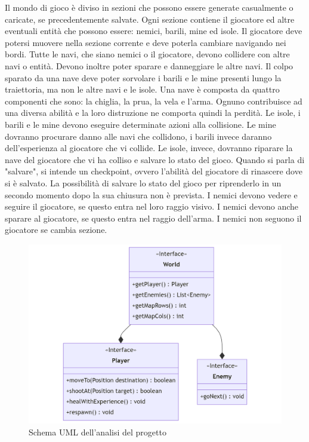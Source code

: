 \documentclass[a4paper,12pt]{report}
\begin{document}
Il mondo di gioco è diviso in sezioni che possono essere generate casualmente o caricate, se precedentemente salvate.
%
Ogni sezione contiene il giocatore ed altre eventuali entità che possono essere: nemici, barili, mine ed isole.
%
Il giocatore deve potersi muovere nella sezione corrente e deve poterla cambiare navigando nei bordi.
%
Tutte le navi, che siano nemici o il giocatore, devono collidere con altre navi o entità.
%
Devono inoltre poter sparare e danneggiare le altre navi.
%
Il colpo sparato da una nave deve poter sorvolare i barili e le mine presenti lungo la traiettoria, ma non le altre navi e le isole.
%
Una nave è composta da quattro componenti che sono: la chiglia, la prua, la vela e l'arma.
%
Ognuno contribuisce ad una diversa abilità e la loro distruzione ne comporta quindi la perdità.
%
Le isole, i barili e le mine devono eseguire determinate azioni alla collisione.
%
Le mine dovranno procurare danno alle navi che collidono, i barili invece daranno dell'esperienza al giocatore che vi collide.
%
Le isole, invece, dovranno riparare la nave del giocatore che vi ha colliso e salvare lo stato del gioco.
%
Quando si parla di "salvare", si intende un checkpoint, ovvero l'abilità del giocatore di rinascere dove si è salvato.
%
La possibilità di salvare lo stato del gioco per riprenderlo in un secondo momento dopo la sua chiusura non è prevista.
%
I nemici devono vedere e seguire il giocatore, se questo entra nel loro raggio visivo.
%
I nemici devono anche sparare al giocatore, se questo entra nel raggio dell'arma.
%
I nemici non seguono il giocatore se cambia sezione.

\begin{figure}[H]
	\centering{}
	\includegraphics[width=\textwidth]{img/Analysis.png}
	\caption{Schema UML dell'analisi del progetto}
	\label{img:Analysis}
\end{figure}
\end{document}
